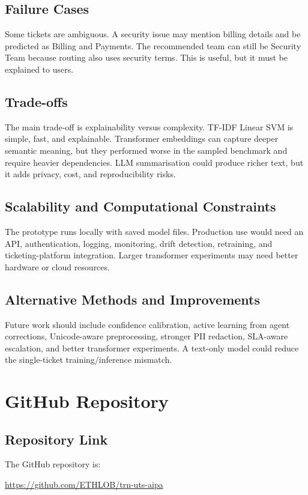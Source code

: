 \documentclass[11pt,a4paper]{article}
\begin{document}
\subsection{Failure Cases}
Some tickets are ambiguous. A security issue may mention billing details and be predicted as Billing and Payments. The recommended team can still be Security Team because routing also uses security terms. This is useful, but it must be explained to users.

\subsection{Trade-offs}
The main trade-off is explainability versus complexity. TF-IDF Linear SVM is simple, fast, and explainable. Transformer embeddings can capture deeper semantic meaning, but they performed worse in the sampled benchmark and require heavier dependencies. LLM summarisation could produce richer text, but it adds privacy, cost, and reproducibility risks.

\subsection{Scalability and Computational Constraints}
The prototype runs locally with saved model files. Production use would need an API, authentication, logging, monitoring, drift detection, retraining, and ticketing-platform integration. Larger transformer experiments may need better hardware or cloud resources.

\subsection{Alternative Methods and Improvements}
Future work should include confidence calibration, active learning from agent corrections, Unicode-aware preprocessing, stronger PII redaction, SLA-aware escalation, and better transformer experiments. A text-only model could reduce the single-ticket training/inference mismatch.

\section{GitHub Repository}
\subsection{Repository Link}
The GitHub repository is:
\begin{center}
\url{https://github.com/ETHLOB/trn-uts-aipa}
\end{center}
\end{document}
